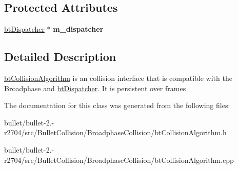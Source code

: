 \subsection*{Protected Attributes}
\begin{DoxyCompactItemize}
\item 
\hypertarget{classbt_collision_algorithm_a11004907cdf3028c635486b435302f90}{\hyperlink{classbt_dispatcher}{bt\+Dispatcher} $\ast$ {\bfseries m\+\_\+dispatcher}}\label{classbt_collision_algorithm_a11004907cdf3028c635486b435302f90}

\end{DoxyCompactItemize}


\subsection{Detailed Description}
\hyperlink{classbt_collision_algorithm}{bt\+Collision\+Algorithm} is an collision interface that is compatible with the Broadphase and \hyperlink{classbt_dispatcher}{bt\+Dispatcher}. It is persistent over frames 

The documentation for this class was generated from the following files\+:\begin{DoxyCompactItemize}
\item 
bullet/bullet-\/2.-\/r2704/src/\+Bullet\+Collision/\+Broadphase\+Collision/bt\+Collision\+Algorithm.\+h\item 
bullet/bullet-\/2.-\/r2704/src/\+Bullet\+Collision/\+Broadphase\+Collision/bt\+Collision\+Algorithm.\+cpp\end{DoxyCompactItemize}
